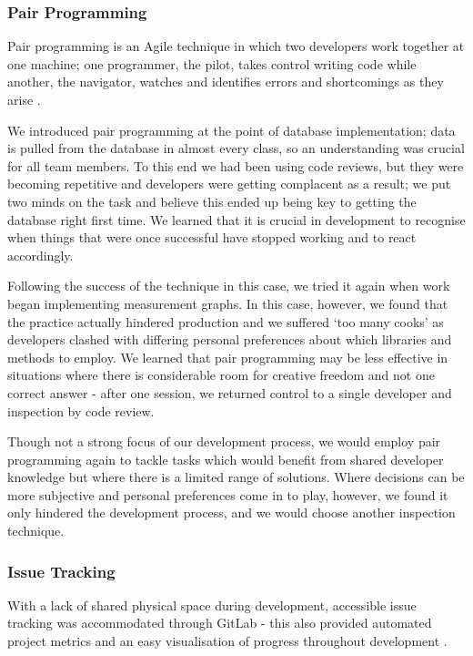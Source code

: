 \documentclass{l3proj}
\begin{document}
\subsubsection{Pair Programming} \label{sec:3.2.4}
Pair programming is an Agile technique in which two developers work together at one machine; one programmer, the pilot, takes control writing code while another, the navigator, watches and identifies errors and shortcomings as they arise \cite[p95]{psd-notes}.

We introduced pair programming at the point of database implementation; data is pulled from the database in almost every class, so an understanding was crucial for all team members. To this end we had been using code reviews, but they were becoming repetitive and developers were getting complacent as a result; we put two minds on the task and believe this ended up being key to getting the database right first time. We learned that it is crucial in development to recognise when things that were once successful have stopped working and to react accordingly.

Following the success of the technique in this case, we tried it again when work began implementing measurement graphs. In this case, however, we found that the practice actually hindered production and we suffered `too many cooks' as developers clashed with differing personal preferences about which libraries and methods to employ. We learned that pair programming may be less effective in situations where there is considerable room for creative freedom and not one correct answer - after one session, we returned control to a single developer and inspection by code review. 

Though not a strong focus of our development process, we would employ pair programming again to tackle tasks which would benefit from shared developer knowledge but where there is a limited range of solutions. Where decisions can be more subjective and personal preferences come in to play, however, we found it only hindered the development process, and we would choose another inspection technique. 


\subsubsection{Issue Tracking} \label{sec:3.2.5}
With a lack of shared physical space during development, accessible issue tracking was accommodated through GitLab - this also provided automated project metrics and an easy visualisation of progress throughout development \cite[p277]{psd-notes}.
\end{document}
